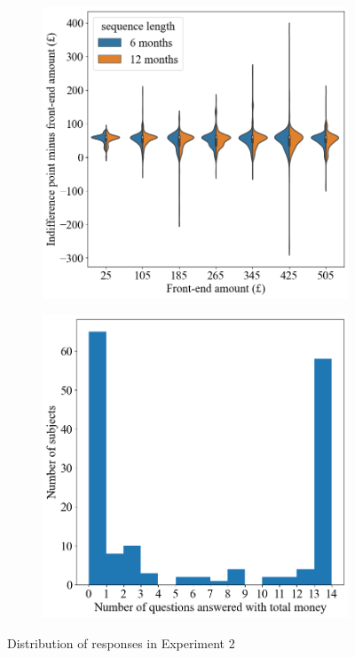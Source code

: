 \documentclass[
  12pt,
]{article}
\begin{document}
\begin{figure}
    \centering
    \begin{subfigure}{0.5\textwidth}
        \centering
        \includegraphics[width=\linewidth]{figures/exp2_dist_indiff_point.png} 
        \subcaption{}
    \end{subfigure}
    \hfill
    \begin{subfigure}{0.49\textwidth}
        \centering
        \includegraphics[width=\linewidth]{figures/exp2_dist_sum_heuristic.png}
        \subcaption{}
    \end{subfigure}
    \caption{Distribution of responses in Experiment 2}
    \label{fig:exp2_response_dist}
\end{figure}
\end{document}
